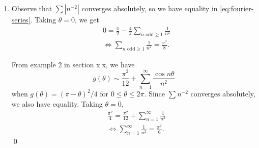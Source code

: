\documentclass[oneside]{article}
\newcommand\abs[1]{\left|#1\right|}
\begin{document}
\begin{enumerate}[label=(\alph*)]
    \item Observe that $\sum\abs{n^{-2}}$ converges absolutely, so we have
    equality in \eqref{eq:fourier-series}. Taking $\theta = 0$, we get
    \begin{align*}
      &0 = \frac{\pi}{2} -
      \frac{4}{\pi}\sum_{n\text{ odd}\geq1}\frac{1}{n^2} \\
      &\iff \sum_{n\text{ odd}\geq1}\frac{1}{n^2} = \frac{\pi^2}{8} \text{.}
    \end{align*}

    From example 2 in section x.x, we have \[
      g(\theta)
      \sim \frac{\pi^2}{12} + \sum_{n=1}^\infty \frac{\cos n\theta}{n^2}
    \] when $g(\theta) = (\pi-\theta)^2/4$ for $0 \leq \theta \leq 2\pi$. Since
    $\sum n^{-2}$ converges absolutely, we also have equality. Taking
    $\theta = 0$,\begin{align*}
      &\frac{\pi^2}{4} = \frac{\pi^2}{12}+\sum_{n=1}^\infty \frac{1}{n^2} \\
      &\iff \sum_{n=1}^\infty \frac{1}{n^2} = \frac{\pi^2}{6} \text{.}
    \end{align*}\qed


  \end{enumerate}
\end{document}
